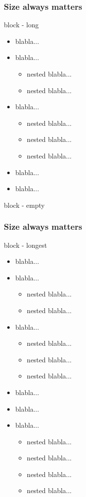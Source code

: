 \documentclass[t,compress,aspectratio=43,12p]{beamer} %
\begin{document}
\begin{frame}
\frametitle{Size always matters}
\begin{block}{block - long}
  \begin{itemize}
    \item blabla...
    \item blabla...
    \begin{itemize}
      \item nested blabla...
      \item nested blabla...
    \end{itemize}
    \item blabla...
    \begin{itemize}
    \item nested blabla...
    \item nested blabla...
    \item nested blabla...
    \end{itemize}
    \item blabla...
    \item blabla...
  \end{itemize}
\end{block}
\begin{block}{block - empty}
\end{block}
\end{frame}

\begin{frame}
\frametitle{Size always matters}
\begin{block}{block - longest}
  \begin{itemize}
    \item blabla...
    \item blabla...
    \begin{itemize}
      \item nested blabla...
      \item nested blabla...
    \end{itemize}
    \item blabla...
    \begin{itemize}
    \item nested blabla...
    \item nested blabla...
    \item nested blabla...
    \end{itemize}
    \item blabla...
    \item blabla...
    \item blabla...
    \begin{itemize}
    \item nested blabla...
    \item nested blabla...
    \item nested blabla...
    \item nested blabla...
    \end{itemize}
  \end{itemize}
\end{block}
\end{frame}
\end{document}
